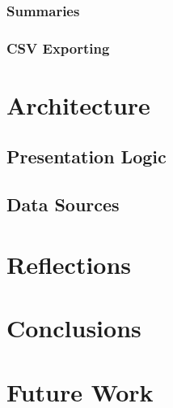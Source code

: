 \documentclass{article}
\begin{document}
\subsubsection{Summaries}

\subsubsection{CSV Exporting}

\section{Architecture}
\subsection{Presentation Logic}
\subsection{Data Sources}
\section{Reflections}
\section{Conclusions}

\section{Future Work}



\end{document}
